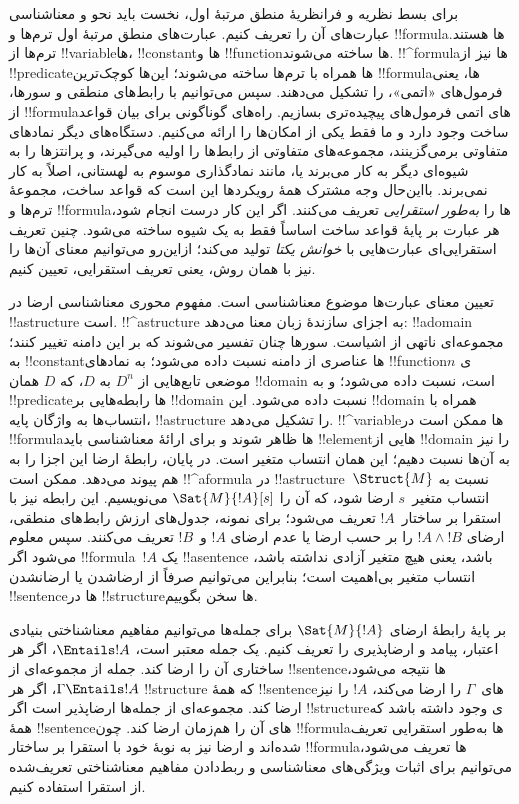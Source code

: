 \documentclass[../../../include/open-logic-section]{subfiles}
\begin{document}


برای بسط نظریه و فرانظریهٔ منطق مرتبهٔ اول، نخست باید نحو و معناشناسی
عبارت‌های آن را تعریف کنیم. عبارت‌های منطق مرتبهٔ اول ترم‌ها و
!!{formula}ها هستند. ترم‌ها از !!{variable}ها، !!{constant}ها و
!!{function}ها ساخته می‌شوند. !!^{formula}ها نیز از !!{predicate}ها
همراه با ترم‌ها ساخته می‌شوند؛ این‌ها کوچک‌ترین !!{formula}ها، یعنی
فرمول‌های «اتمی»، را تشکیل می‌دهند. سپس می‌توانیم با رابط‌های
منطقی و سورها، از !!{formula}های اتمی فرمول‌های پیچیده‌تری بسازیم.
راه‌های گوناگونی برای بیان قواعد ساخت وجود دارد و ما فقط یکی از
امکان‌ها را ارائه می‌کنیم. دستگاه‌های دیگر نمادهای متفاوتی برمی‌گزینند،
مجموعه‌های متفاوتی از رابط‌ها را اولیه می‌گیرند، و پرانتزها را به
شیوه‌ای دیگر به کار می‌برند یا، مانند نمادگذاری موسوم به لهستانی، اصلاً
به کار نمی‌برند. بااین‌حال وجه مشترک همهٔ رویکردها این است که قواعد
ساخت، مجموعهٔ ترم‌ها و !!{formula}ها را \emph{به‌طور استقرایی} تعریف
می‌کنند. اگر این کار درست انجام شود، هر عبارت بر پایهٔ قواعد ساخت
اساساً فقط به یک شیوه ساخته می‌شود. چنین تعریف استقرایی‌ای عبارت‌هایی
با \emph{خوانش یکتا} تولید می‌کند؛ ازاین‌رو می‌توانیم معنای آن‌ها را
نیز با همان روش، یعنی تعریف استقرایی، تعیین کنیم.

تعیین معنای عبارت‌ها موضوع معناشناسی است. مفهوم محوری معناشناسی ارضا
در !!a{structure} است. !!^a{structure} به اجزای سازندهٔ زبان معنا
می‌دهد: !!a{domain} مجموعه‌ای ناتهی از اشیاست. سورها چنان تفسیر
می‌شوند که بر این دامنه تغییر کنند؛ به !!{constant}ها عناصری از دامنه
نسبت داده می‌شود؛ به نمادهای !!{function}ی $n$موضعی تابع‌هایی از
$D^n$ به $D$، که $D$ همان !!{domain} است، نسبت داده می‌شود؛ و به
!!{predicate}ها رابطه‌هایی بر !!{domain} نسبت داده می‌شود. این
!!{domain} همراه با انتساب‌ها به واژگان پایه، !!a{structure} را تشکیل
می‌دهد.
!!^{variable}ها ممکن است در !!{formula}ها ظاهر شوند و برای ارائهٔ
معناشناسی باید !!{element}هایی از !!{domain} را نیز به آن‌ها نسبت
دهیم؛ این همان انتساب متغیر است. در پایان، رابطهٔ ارضا این اجزا را به
هم پیوند می‌دهد. ممکن است !!^a{formula} در !!a{structure}~$\Struct{M}$
نسبت به انتساب متغیر~$s$ ارضا شود، که آن را
$\Sat{M}{!A}[s]$ می‌نویسیم. این رابطه نیز با استقرا بر ساختار~$!A$
تعریف می‌شود؛ برای نمونه، جدول‌های ارزش رابط‌های منطقی، ارضای
$!A \land !B$ را بر حسب ارضا یا عدم ارضای $!A$ و~$!B$ تعریف می‌کنند.
سپس معلوم می‌شود اگر !!{formula}~$!A$ یک !!a{sentence} باشد، یعنی هیچ
متغیر آزادی نداشته باشد، انتساب متغیر بی‌اهمیت است؛ بنابراین می‌توانیم
صرفاً از ارضاشدن یا ارضانشدن !!{sentence}ها در !!{structure}ها سخن
بگوییم.

بر پایهٔ رابطهٔ ارضای $\Sat{M}{!A}$ برای جمله‌ها می‌توانیم مفاهیم
معناشناختی بنیادی اعتبار، پیامد و ارضاپذیری را تعریف کنیم. یک جمله
معتبر است، $\Entails !A$، اگر هر ساختاری آن را ارضا کند. جمله از
مجموعه‌ای از !!{sentence}ها نتیجه می‌شود، $\Gamma \Entails !A$، اگر هر
!!{structure} که همهٔ !!{sentence}های~$\Gamma$ را ارضا می‌کند، $!A$ را
نیز ارضا کند. مجموعه‌ای از جمله‌ها ارضاپذیر است اگر !!{structure}ی
وجود داشته باشد که همهٔ !!{sentence}های آن را هم‌زمان ارضا کند. چون
!!{formula}ها به‌طور استقرایی تعریف شده‌اند و ارضا نیز به نوبهٔ خود با
استقرا بر ساختار !!{formula}ها تعریف می‌شود، می‌توانیم برای اثبات
ویژگی‌های معناشناسی و ربط‌دادن مفاهیم معناشناختی تعریف‌شده از استقرا
استفاده کنیم.
\end{document}

